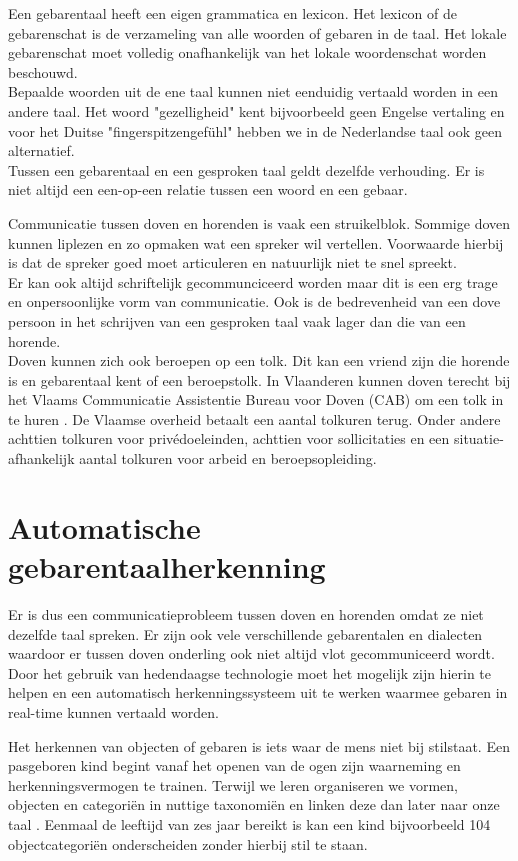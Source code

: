 \npar Een gebarentaal heeft een eigen grammatica en lexicon. Het lexicon of de gebarenschat is de verzameling van alle woorden of gebaren in de taal. Het lokale gebarenschat moet volledig onafhankelijk van het lokale woordenschat worden beschouwd.
\\Bepaalde woorden uit de ene taal kunnen niet eenduidig vertaald worden in een andere taal. Het woord "gezelligheid" kent bijvoorbeeld geen Engelse vertaling en voor het Duitse "fingerspitzengef\"uhl" hebben we in de Nederlandse taal ook geen alternatief.
\\Tussen een gebarentaal en een gesproken taal geldt dezelfde verhouding. Er is niet altijd een een-op-een relatie tussen een woord en een gebaar.

\npar Communicatie tussen doven en horenden is vaak een struikelblok. Sommige doven kunnen liplezen en zo opmaken wat een spreker wil vertellen. Voorwaarde hierbij is dat de spreker goed moet articuleren en natuurlijk niet te snel spreekt.
\\ Er kan ook altijd schriftelijk gecommunciceerd worden maar dit is een erg trage en onpersoonlijke vorm van communicatie. Ook is de bedrevenheid van een dove persoon in het schrijven van een gesproken taal vaak lager dan die van een horende.
\\ Doven kunnen zich ook beroepen op een tolk. Dit kan een vriend zijn die horende is en gebarentaal kent of een beroepstolk. In Vlaanderen kunnen doven terecht bij het Vlaams Communicatie Assistentie Bureau voor Doven (CAB) om een tolk in te huren \cite{tolkuren}. De Vlaamse overheid betaalt een aantal tolkuren terug. Onder andere achttien tolkuren voor priv\'edoeleinden, achttien voor sollicitaties en een situatie-afhankelijk aantal tolkuren voor arbeid en beroepsopleiding.
 
\section{Automatische gebarentaalherkenning}
Er is dus een communicatieprobleem tussen doven en horenden omdat ze niet dezelfde taal spreken. Er zijn ook vele verschillende gebarentalen en dialecten waardoor er tussen doven onderling ook niet altijd vlot gecommuniceerd wordt.
Door het gebruik van hedendaagse technologie moet het mogelijk zijn hierin te helpen en een automatisch herkenningssysteem uit te werken waarmee gebaren in real-time kunnen vertaald worden.

\npar Het herkennen van objecten of gebaren is iets waar de mens niet bij stilstaat. Een pasgeboren kind begint vanaf het openen van de ogen zijn waarneming en herkenningsvermogen te trainen. Terwijl we leren organiseren we vormen, objecten en categori\"en in nuttige taxonomi\"en en linken deze dan later naar onze taal \cite{oneshot-object-cat}. Eenmaal de leeftijd van zes jaar bereikt is kan een kind bijvoorbeeld 104 objectcategori\"en onderscheiden zonder hierbij stil te staan.

